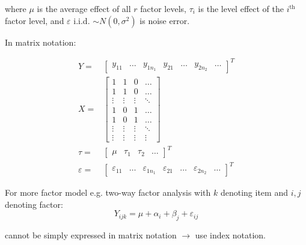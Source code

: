     where $ \mu  $ is the average effect of all $ r $ factor levels, $ \tau_i $ is the level effect of the $ i^\mathrm{th}  $ factor level, and $ \varepsilon  $ i.i.d. $ \sim N(0,\sigma ^2) $ is noise error.
    
    In matrix notation:

    \begin{subequations}
        \begin{align}
            Y=&\begin{bmatrix}
        y_{11}&\ldots& y_{1n_1}&y_{21}&\ldots &y_{2n_2}&\ldots
        \end{bmatrix}^T\\
            X=&\begin{bmatrix}
            1&1&0&\ldots\\
            1&1&0&\ldots\\
            \vdots&\vdots&\vdots&\ddots\\
            1&0&1&\ldots\\
            1&0&1&\ldots\\
            \vdots&\vdots&\vdots&\ddots\\
            \vdots&\vdots&\vdots&\vdots
        \end{bmatrix}\\
        \tau=&\begin{bmatrix}
            \mu&\tau_1&\tau_2&\ldots
        \end{bmatrix}^T\\
        \varepsilon =&\begin{bmatrix}
            \varepsilon _{11}&\ldots&\varepsilon _{1n_1}&\varepsilon _{21}&\ldots&\varepsilon _{2n_2}&\ldots
                \end{bmatrix}^T
        \end{align}
    \end{subequations}

    For more factor model e.g. two-way factor analysis with $ k $ denoting item and $ i,j $ denoting factor:
    \[
         Y_{ijk}=\mu +\alpha _i+\beta _j+\varepsilon  _{ij}
    \]

    cannot be simply expressed in matrix notation $ \longrightarrow $ use index notation.
    
    

    






























